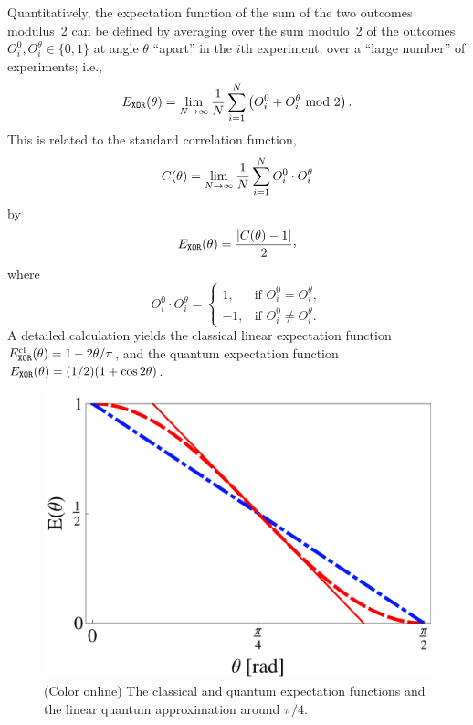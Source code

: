 \documentclass{mscs}
\begin{document}
Quantitatively, the expectation function of the sum of the two outcomes modulus~2 can be defined by  averaging over the sum modulo~2 of the outcomes $O^0_i, O^\theta _i\in \{0,1\}$ at angle $\theta$ ``apart''
in the $i$th experiment, over a ``large number'' of experiments; i.e.,
\begin{equation*}
E_{\tt XOR}(\theta )=\lim_{N \rightarrow \infty} {1\over N}\sum_{i=1}^N \left( O^0_i + O^\theta _i \text{ mod }2\right).
\end{equation*}
This is related to the standard correlation function,
\begin{equation*}
	C(\theta)=\lim_{N\to \infty}{1\over N}\sum_{i=1}^N O^0_i \cdot O^\theta_i
\end{equation*}
by
\begin{equation*}
	E_{\tt XOR}(\theta)=\frac{|C(\theta)-1|}{2} \raisebox{0.5ex}{,}
\end{equation*}
where
\begin{equation*}
	O^0_i \cdot O^\theta_i =
	\begin{cases}
		1, & \mbox{if }O^0_i = O^\theta_i,\\
		-1, & \mbox{if }O^0_i \neq O^\theta_i.
	\end{cases}
\end{equation*}
A detailed calculation yields the classical linear expectation function
$E^{\text{cl}} _{\tt XOR}(\theta ) = {1-2 \theta / \pi}$,
and the quantum expectation function
$E_{\tt XOR}(\theta ) = (1/2)(1+\cos 2\theta )$.
\begin{figure}[h]
\begin{center}
	\includegraphics[scale=0.7]{2010-qxor-f1}
\end{center}
\caption{(Color online) The classical and quantum expectation functions and the linear quantum approximation around $\pi/4$.}
\label{corrFuncs}
\end{figure}
\end{document}
